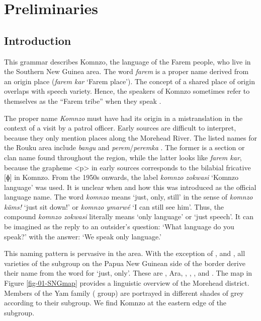 
\chapter{Preliminaries}
\label{cha:The language and its speakers}

\section{Introduction}\label{prelimintro}
This grammar describes Komnzo, the language of the Farem people, who live in the Southern New Guinea area. The word \emph{farem} is a proper name derived from an origin place (\textit{farem kar} `Farem place'). The concept of a shared place of origin overlaps with speech variety. Hence, the speakers of Komnzo sometimes refer to themselves as the ``Farem tribe'' when they speak .

The proper name \emph{Komnzo} must have had its origin in a mistranslation in the context of a visit by a patrol officer. Early sources are difficult to interpret, because they only mention places along the Morehead River. The listed names for the Rouku area include \emph{bangu} \citep[292]{Ray:1907westfly} and \emph{perem}/\emph{peremka} \citep[334]{Ray:1923westerndiv}. The former is a section or clan name found throughout the region, while the latter looks like \emph{farem kar}, because the grapheme <p> in early sources corresponds to the bilabial fricative [ɸ] in Komnzo. From the 1950s onwards, the label \emph{komnzo zokwasi} `Komnzo language' was used. It is unclear when and how this was introduced as the official language name. The word \emph{komnzo} means `just, only, still' in the sense of \emph{komnzo käms!} `just sit down!' or \emph{komnzo ymarwé} `I can still see him'. Thus, the compound \emph{komnzo zokwasi} literally means `only language' or `just speech'. It can be imagined as the reply to an outsider's question: `What language do you speak?' with the answer: `We speak only language.'

This naming pattern is pervasive in the area. With the exception of ,  and , all varieties of the  subgroup on the Papua New Guinean side of the border derive their name from the word for `just, only'. These are , Ara, , , ,  and . The map in Figure \ref{fig-01-SNGmap} provides a linguistic overview of the Morehead district. Members of the Yam family ( group) are portrayed in different shades of grey according to their subgroup. We find Komnzo at the eastern edge of the  subgroup.

